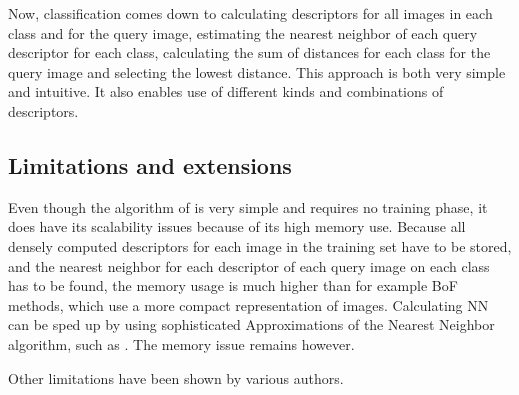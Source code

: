 \documentclass[a4paper,10pt]{article}
\begin{document}
Now, classification comes down to calculating descriptors for all images in each class and for the query image, estimating the nearest neighbor of each query descriptor for each class, calculating the sum of distances for each class for the query image and selecting the lowest distance. This approach is both very simple and intuitive. It also enables use of different kinds and combinations of descriptors.



\subsection{Limitations and extensions} %
\label{sub:limitations_and_extensions}

Even though the algorithm of \cite{boiman2008defense} is very simple and requires no training phase, it does have its scalability issues because of its high memory use. Because all densely computed descriptors for each image in the training set have to be stored, and the nearest neighbor for each descriptor of each query image on each class has to be found, the memory usage is much higher than for example BoF methods, which use a more compact representation of images. Calculating NN can be sped up by using sophisticated Approximations of the Nearest Neighbor algorithm, such as . The memory issue remains however.

Other limitations have been shown by various authors.\cite{behmo2010towards, wang2011improved,mccann2012local,tuytelaars2011nbnn,timofte2012iterative}
\end{document}
